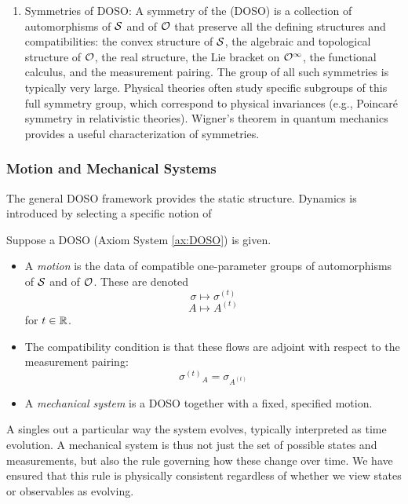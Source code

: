 \begin{remark}
\begin{enumerate}
\item Symmetries of DOSO: A symmetry of the  (DOSO) is a collection of automorphisms of $\mathcal{S}$ and of $\mathcal{O}$ that preserve all the defining structures and compatibilities: the convex structure of $\mathcal{S}$, the algebraic and topological structure of $\mathcal{O}$, the real structure, the Lie bracket on $\mathcal{O}^\infty$, the functional calculus, and the measurement pairing. The group of all such symmetries is typically very large. Physical theories often study specific subgroups of this full symmetry group, which correspond to physical invariances (e.g., Poincaré symmetry in relativistic theories). Wigner's theorem in quantum mechanics provides a useful characterization of symmetries.
\end{enumerate}
\end{remark}

\subsubsection{Motion and Mechanical Systems}

The general DOSO framework provides the static structure. Dynamics is introduced by selecting a specific notion of 

\begin{definition} \label{def:1.11}
Suppose a DOSO (Axiom System \ref{ax:DOSO}) is given.
\begin{itemize}
\item A \emph{motion} is the data of compatible one-parameter groups of automorphisms of $\mathcal{S}$ and of $\mathcal{O}$. These are denoted
\[ \sigma\mapsto\sigma^{(t)} \]
\[ A\mapsto A^{(t)} \]
for $t \in \mathbb{R}$.
\item The compatibility condition is that these flows are adjoint with respect to the measurement pairing:
\[ {\sigma^{(t)}}_{A}=\sigma_{A^{(t)}} \]
\item A \emph{mechanical system} is a DOSO together with a fixed, specified motion.
\end{itemize}
\end{definition}


A  singles out a particular way the system evolves, typically interpreted as time evolution. A mechanical system is thus not just the set of possible states and measurements, but also the rule governing how these change over time. We have ensured that this rule is physically consistent regardless of whether we view states or observables as evolving.


